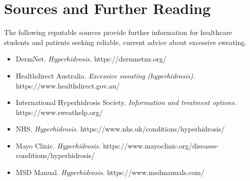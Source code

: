 \section*{Sources and Further Reading}
The following reputable sources provide further information for healthcare students and patients seeking reliable, current advice about excessive sweating.
\begin{itemize}
    \item DermNet. \textit{Hyperhidrosis.} https://dermnetnz.org/
    \item Healthdirect Australia. \textit{Excessive sweating (hyperhidrosis).} https://www.healthdirect.gov.au/
    \item International Hyperhidrosis Society. \textit{Information and treatment options.} https://www.sweathelp.org/
    \item NHS. \textit{Hyperhidrosis.} https://www.nhs.uk/conditions/hyperhidrosis/
    \item Mayo Clinic. \textit{Hyperhidrosis.} https://www.mayoclinic.org/diseases-conditions/hyperhidrosis/
    \item MSD Manual. \textit{Hyperhidrosis.} https://www.msdmanuals.com/
\end{itemize}
